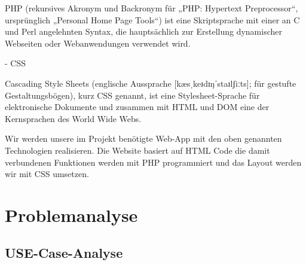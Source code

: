 PHP (rekursives Akronym und Backronym für „PHP: Hypertext Preprocessor“, ursprünglich „Personal Home Page Tools“) ist eine Skriptsprache mit einer an C und Perl angelehnten Syntax, die hauptsächlich zur Erstellung dynamischer Webseiten oder Webanwendungen verwendet wird.

- CSS

Cascading Style Sheets (englische Aussprache [kæsˌkeɪdɪŋˈstaɪlʃiːts]; für gestufte Gestaltungsbögen), kurz CSS genannt, ist eine Stylesheet-Sprache für elektronische Dokumente und zusammen mit HTML und DOM eine der Kernsprachen des World Wide Webs.

Wir werden unsere im Projekt benötigte Web-App mit den oben genannten Technologien realisieren.
Die Website basiert auf HTML Code die damit verbundenen Funktionen werden mit PHP programmiert und das Layout werden wir mit CSS umsetzen.



\chapter{Problemanalyse}
\section{USE-Case-Analyse}


